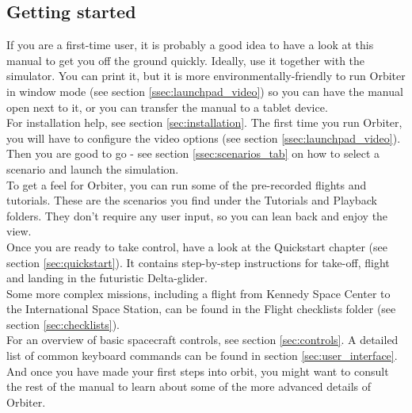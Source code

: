 \documentclass[Orbiter User Manual.tex]{subfiles}
\begin{document}
\subsection{Getting started}
If you are a first-time user, it is probably a good idea to have a look at this manual to get you off the ground quickly. Ideally, use it together with the simulator. You can print it, but it is more environmentally-friendly to run Orbiter in window mode (see section \ref{ssec:launchpad_video}) so you can have the manual open next to it, or you can transfer the manual to a tablet device.\\
For installation help, see section \ref{sec:installation}. The first time you run Orbiter, you will have to configure the video options (see section \ref{ssec:launchpad_video}). Then you are good to go - see section \ref{ssec:scenarios_tab} on how to select a scenario and launch the simulation.\\
To get a feel for Orbiter, you can run some of the pre-recorded flights and tutorials. These are the scenarios you find under the Tutorials and Playback folders. They don't require any user input, so you can lean back and enjoy the view.\\
Once you are ready to take control, have a look at the Quickstart chapter (see section \ref{sec:quickstart}). It contains step-by-step instructions for take-off, flight and landing in the futuristic Delta-glider.\\
Some more complex missions, including a flight from Kennedy Space Center to the International Space Station, can be found in the Flight checklists folder (see section \ref{sec:checklists}).\\
For an overview of basic spacecraft controls, see section \ref{sec:controls}. A detailed list of common keyboard commands can be found in section \ref{sec:user_interface}.\\
And once you have made your first steps into orbit, you might want to consult the rest of the manual to learn about some of the more advanced details of Orbiter.
\end{document}
